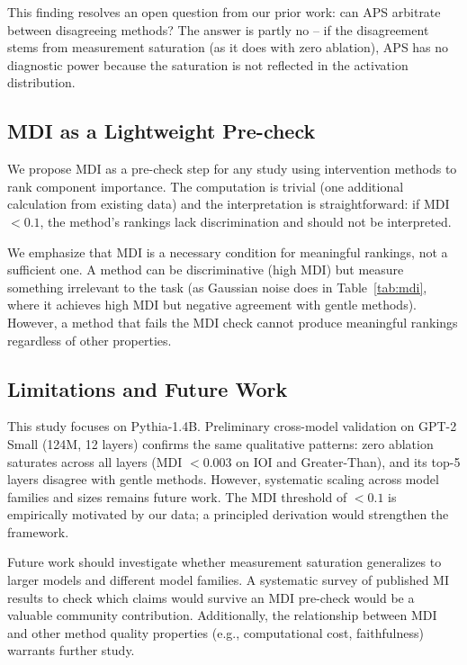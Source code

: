 \documentclass[pdflatex,sn-mathphys-num]{sn-jnl}
\begin{document}
This finding resolves an open question from our prior work: can APS arbitrate between disagreeing methods? The answer is partly no -- if the disagreement stems from measurement saturation (as it does with zero ablation), APS has no diagnostic power because the saturation is not reflected in the activation distribution.

\subsection{MDI as a Lightweight Pre-check}

We propose MDI as a pre-check step for any study using intervention methods to rank component importance. The computation is trivial (one additional calculation from existing data) and the interpretation is straightforward: if MDI $< 0.1$, the method's rankings lack discrimination and should not be interpreted.

We emphasize that MDI is a necessary condition for meaningful rankings, not a sufficient one. A method can be discriminative (high MDI) but measure something irrelevant to the task (as Gaussian noise does in Table~\ref{tab:mdi}, where it achieves high MDI but negative agreement with gentle methods). However, a method that fails the MDI check cannot produce meaningful rankings regardless of other properties.

\subsection{Limitations and Future Work}

This study focuses on Pythia-1.4B. Preliminary cross-model validation on GPT-2 Small (124M, 12 layers) confirms the same qualitative patterns: zero ablation saturates across all layers (MDI $< 0.003$ on IOI and Greater-Than), and its top-5 layers disagree with gentle methods. However, systematic scaling across model families and sizes remains future work. The MDI threshold of $< 0.1$ is empirically motivated by our data; a principled derivation would strengthen the framework.

Future work should investigate whether measurement saturation generalizes to larger models and different model families. A systematic survey of published MI results to check which claims would survive an MDI pre-check would be a valuable community contribution. Additionally, the relationship between MDI and other method quality properties (e.g., computational cost, faithfulness) warrants further study.
\end{document}
